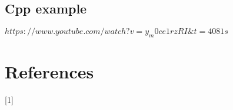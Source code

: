 \documentclass[conference]{IEEEtran}
\begin{document}
\subsection{Cpp example}
$https://www.youtube.com/watch?v=y_m0ce1rzRI\&t=4081s$
\section*{References}
[1] 



\end{document}
